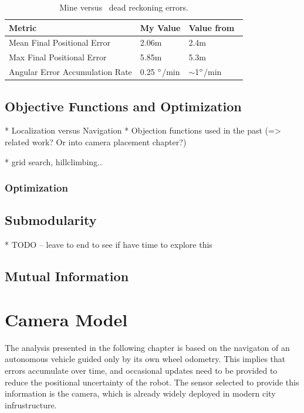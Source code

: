 \documentclass[a4paper,12pt,twoside,openright]{report}
\begin{document}
\begin{table}[htb]
\centering
\caption[Noise Calibration Results]{Mine versus~\citeauthor{vivacqua2017low} dead reckoning errors.}
\label{tab:impl:calibration}
\begin{tabular}{@{}lll@{}}
\toprule
Metric                          & My Value           & Value from~\cite{vivacqua2017low} \\ \midrule
Mean Final Positional Error     & 2.06m              & 2.4m                                                          \\
Max Final Positional Error      & 5.85m              & 5.3m                                                          \\
Angular Error Accumulation Rate & 0.25 $\degree$/min & $\sim$1$\degree$/min                                         
\end{tabular}
\end{table}


\section{Objective Functions and Optimization}

* Localization versus Navigation
* Objection functions used in the past (=> related work? Or into camera placement chapter?) 

* grid search, hillclimbing..
\subsection{Optimization}
\label{sec:impl:optimization}

\section{Submodularity}
* TODO -- leave to end to see if have time to explore this

\section{Mutual Information}



\chapter{Camera Model}
\label{chap:cameramodel}

The analysis presented in the following chapter is based on the navigaton of an
autonomous vehicle guided only by its own wheel odometry. 
This implies that errors accumulate over time, and
occasional updates need to be provided to reduce the positional 
uncertainty of the robot. The sensor selected to provide this
information is the camera, which is already widely deployed
in modern city infrustructure.
\end{document}
